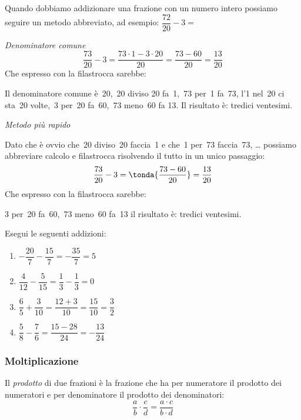 \begin{esempio}
 Quando dobbiamo addizionare una frazione con un numero intero possiamo
seguire un metodo abbreviato, ad esempio:
\(\dfrac{72}{20} - 3 =\)

\emph{Denominatore comune}
\[\dfrac{73}{20} - 3 = \dfrac{73 \cdot 1 - 3 \cdot 20}{20} =
  \dfrac{73 - 60}{20} = \dfrac{13}{20}\]
Che espresso con la filastrocca sarebbe:

Il denominatore comune è~20,~20 diviso 20 fa~1,~73 per~1 fa~73,
l'1 nel~20 ci sta~20 volte,~3 per~20 fa~60,~73 meno~60 fa 13.
Il risultato è: tredici ventesimi.

\emph{Metodo più rapido}

Dato che è ovvio che~20 diviso~20 faccia~1 e che~1 per~73 faccia~73, \dots
possiamo abbreviare calcolo e filastrocca risolvendo il tutto in un unico
passaggio:
\[\dfrac{73}{20} - 3 = \tonda{\dfrac{73 - 60}{20}} = \dfrac{13}{20}\]
Che espresso con la filastrocca sarebbe:

3 per~20 fa~60,~73 meno~60 fa~13 il risultato è: tredici ventesimi.
\end{esempio}

\begin{esempio}
 Esegui le seguenti addizioni:
 \begin{multicols}{2}
 \begin{enumerate} [noitemsep]
  \item \(-\dfrac{20}{7} -\dfrac{15}{7} = -\dfrac{35}{7} = 5\)
  \item \(\dfrac{4}{12} - \dfrac{5}{15} = \dfrac{1}{3} - \dfrac{1}{3} = 0\)
  \item \(\dfrac{6}{5} + \dfrac{3}{10} = \dfrac{12 + 3}{10} =
          \dfrac{15}{10} = \dfrac{3}{2}\)
  \item \(\dfrac{5}{8} - \dfrac{7}{6} = \dfrac{15 - 28}{24} =
          -\dfrac{13}{24}\)
 \end{enumerate}
 \end{multicols}
\end{esempio}


\subsubsection{Moltiplicazione}

\begin{definizione}
 Il \emph{prodotto} di due frazioni è la frazione che ha per
numeratore il prodotto dei numeratori e per denominatore il prodotto dei
denominatori:
\[\dfrac{a}{b} \cdot \dfrac{c}{d} = \dfrac{a \cdot c}{b \cdot d}\]
\end{definizione}

